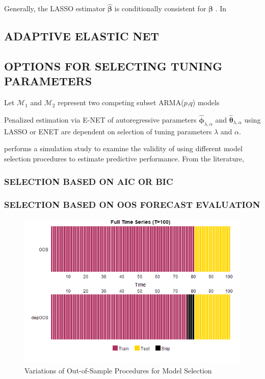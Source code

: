 Generally, the LASSO estimator $\hat{\bm{\beta}}$ is conditionally consistent for $\bm{\beta}$ 
\cite{Zhao2006}.
In \cite{Zou2006}

\subsection{ADAPTIVE ELASTIC NET}


\subsection{OPTIONS FOR SELECTING TUNING PARAMETERS}
Let $\mathcal{M}_1$ and $\mathcal{M}_2$ represent two competing subset ARMA($p$,$q$) models

Penalized estimation via E-NET of autoregressive parameters $\hat{\bm{\phi}}_{\lambda,\alpha}$ and $\hat{\bm{\theta}}_{\lambda,\alpha}$ using LASSO or ENET are dependent on selection of tuning parameters $\lambda$ and  $\alpha$.

\cite{Bergmeir2018} performs a simulation study to examine the validity of using different model selection procedures to estimate predictive performance. From the literature, 

\subsubsection{SELECTION BASED ON AIC OR BIC}

\subsubsection{SELECTION BASED ON OOS FORECAST EVALUATION}

\begin{figure}[htbp!]
	\caption{Variations of Out-of-Sample Procedures for Model Selection}
	\label{fig:oosplots}
	\includegraphics[scale=0.7]{oosplots}
\end{figure}

